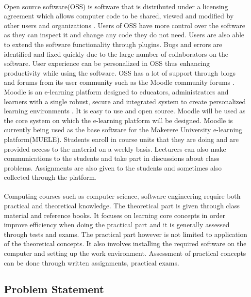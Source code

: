 \documentclass[12pt]{article}
\begin{document}
\paragraph{}Open source software(OSS) is software that is distributed under a licensing agreement which allows computer code to be shared, viewed and modified by other users and organizations \cite{oss}. Users of OSS have more control over the software as they can inspect it and change any code they do not need. Users are also able to extend the software functionality through plugins. Bugs and errors are identified and fixed quickly due to the large number of collaborators on the software. User experience can be personalized in OSS thus enhancing productivity while using the software. OSS has a lot of support through blogs and forums from its user community such as the Moodle community forums \cite{moodleSupport}. Moodle is an e-learning platform designed to educators, administrators and learners with a single robust, secure and integrated system to create personalized learning environments \cite{moodleAbout}. It is easy to use and open source. Moodle will be used as the core system on which the e-learning platform will be designed. Moodle is currently being used as the base software for the Makerere University e-learning platform(MUELE). Students enroll in course units that they are doing and are provided access to the material on a weekly basis. Lecturers can also make communications to the students and take part in discussions about class problems. Assignments are also given to the students and sometimes also collected through the platform.
\paragraph{}Computing courses such as computer science, software engineering require both practical and theoretical knowledge. The theoretical part is given through class material and reference books. It focuses on learning core concepts in order improve efficiency when doing the practical part and it is generally assessed through tests and exams. The practical part however is not limited to application of the theoretical concepts. It also involves installing the required software on the computer and setting up the work environment. Assessment of practical concepts can be done through written assignments, practical exams.

	\subsection{Problem Statement}
	
\end{document}
